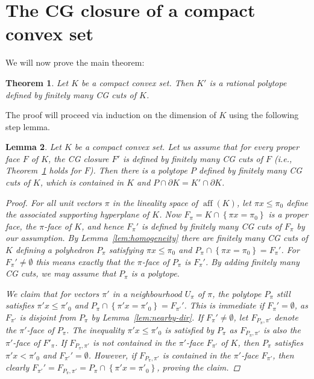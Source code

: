 \documentclass[11pt]{article}
\newtheorem{thm}{Theorem}
\newtheorem{lem}[thm]{Lemma}
\theoremstyle{remark}
\begin{document}
\section{The {CG\xspace} closure of a compact convex set}
\label{sec:gc-closure-compact}

We will now prove the main theorem:
\begin{thm}
  \label{thm:cg-closure-polytope}
  Let \(K\) be a compact convex set.
  Then \(K'\) is a rational polytope
  defined by finitely many {CG\xspace} cuts of \(K\).
\end{thm}

The proof will proceed via induction on the dimension of \(K\) using
the following step lemma. 

\begin{lem}
  \label{lem:boundary}
  Let \(K\) be a compact convex set.
  Let us assume that for every proper face \(F\) of \(K\),
  the {CG\xspace} closure \(F'\) is defined by finitely many {CG\xspace} cuts of \(F\)
  (i.e., Theorem~\ref{thm:cg-closure-polytope} holds for \(F\)).
  Then
  there is a polytope \(P\) defined by finitely many {CG\xspace} cuts of \(K\),
  which is contained in \(K\)
  and \(P \cap \partial K = K' \cap \partial K\).
\begin{proof}
For all unit vectors \(\pi\) in the lineality space of \({\operatorname{aff}({K})}\),
let \(\pi x \leq \pi_{0}\) define
the associated supporting hyperplane of \(K\).
Now \(F_{\pi} = K \cap {\left\{{ \pi x = \pi_0}\right\}}\)
is a proper face, the \(\pi\)-face of \(K\),
and hence \(F_{\pi}'\) is defined
by finitely many {CG\xspace} cuts of \(F_{\pi}\) by our assumption.
By Lemma~\ref{lem:homogeneity} there are finitely many {CG\xspace} cuts
of \(K\) defining a polyhedron \(P_{\pi}\)
satisfying \(\pi x \leq \pi_{0}\)
and \(P_{\pi} \cap {\left\{{ \pi x = \pi_0}\right\}} = F_{\pi}'\).
For \(F_{\pi}' \neq \emptyset\) this means exactly
that the \(\pi\)-face of \(P_{\pi}\) is \(F_{\pi}'\).
By adding finitely many {CG\xspace} cuts,
we may assume that \(P_{\pi}\) is a polytope.

We claim that
for vectors \(\pi'\) in a neighbourhood \(U_{\pi}\) of \(\pi\),
the polytope \(P_{\pi}\) still satisfies
\(\pi' x \leq \pi'_{0}\)
and \(P_{\pi} \cap {\left\{{ \pi' x = \pi'_0}\right\}} = F_{\pi'}'\).
This is immediate
if \(F_{\pi}' = \emptyset\),
as \(F_{\pi'}\) is disjoint from \(P_{\pi}\)
by Lemma~\ref{lem:nearby-dir}.
If \(F_{\pi}' \neq \emptyset\),
let \(F_{P_{\pi}, \pi'}\) denote the \(\pi'\)-face of \(P_{\pi}\).
The inequality \(\pi' x \leq \pi'_{0}\)
is satisfied by \(P_{\pi}\) as \(F_{P_{\pi}, \pi'}\)
is also the \(\pi'\)-face of \(F'_{\pi}\).
If \(F_{P_{\pi}, \pi'}\) is not contained
in the \(\pi'\)-face \(F_{\pi'}\) of \(K\),
then \(P_{\pi}\) satisfies \(\pi' x < \pi'_{0}\) and
\(F_{\pi'}' = \emptyset\).
However,
if \(F_{P_{\pi}, \pi'}\) is contained in the \(\pi'\)-face \(F_{\pi'}\),
then clearly
\(F_{\pi'}' = F_{P_{\pi}, \pi'} = P_{\pi} \cap {\left\{{ \pi' x = \pi'_{0}}\right\}}\),
proving the claim.


\end{proof}
\end{lem}
\end{document}
